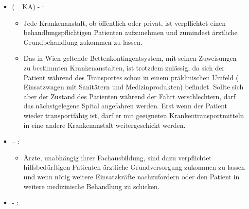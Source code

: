 \begin{itemize}
    \item {\mdseries
     (=
    KA) - :}
    
    
    \begin{itemize}
        
        \item {\mdseries
        Jede Krankenanstalt, ob \"offentlich oder privat, ist verpflichtet einen
        behandlungspflichtigen Patienten  aufzunehmen und
        zumindest ärztliche Grundbehandlung zukommen zu lassen. }
        
        \item {\mdseries
        Das in Wien geltende Bettenkontingentsystem, mit seinen Zuweisungen zu
        bestimmten Krankenanstalten, ist trotzdem zulässig, da
        sich der Patient während des Transportes schon in einem präklinischen Umfeld (=
        Einsatzwagen mit Sanitätern und Medizinprodukten) befindet. Sollte
        sich aber der Zustand des Patienten während der Fahrt
        verschlechtern, darf das nächstgelegene Spital angefahren werden. \newline
        Erst wenn der Patient wieder transportfähig ist, darf er mit geeigneten
        Krankentransportmitteln in eine andere Krankenanstalt weitergeschickt werden.}
        
    \end{itemize}
    
    \item {\mdseries
     --	:}
       
       \begin{itemize}
           
           \item {\mdseries
           \"Arzte, unabhängig ihrer Fachausbildung, sind dazu verpflichtet
           hilfsbed\"urftigen Patienten ärztliche Grundversorgung
           zukommen zu lassen und wenn n\"otig weitere Einsatzkräfte nachzufordern oder den Patient in
           weitere medizinische Behandlung zu schicken.}
           
       \end{itemize}
       
       \item {\mdseries
        -
       :}
       

\end{itemize}
